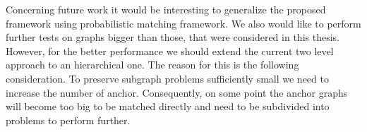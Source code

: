 Concerning future work it would be interesting to generalize the proposed framework using probabilistic matching framework. We also would like to perform further tests on graphs bigger than those, that were considered in this thesis. However, for the better performance we should extend the current two level approach to an hierarchical one. The reason for this is the following consideration. To preserve subgraph problems sufficiently small we need to increase the number of anchor. Consequently, on some point the anchor graphs will become too big to be matched directly and need to be subdivided into problems to perform further.

 
